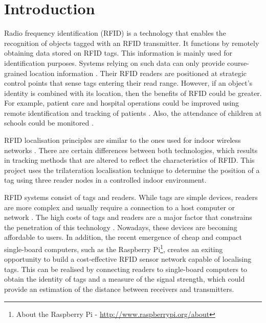 \chapter{Introduction}
\label{ch:introduction}

Radio frequency identification (RFID) is a technology that enables the recognition of objects tagged with an RFID transmitter. It functions by remotely obtaining data stored on RFID tags. This information is mainly used for identification purposes. Systems relying on such data can only provide course-grained location information \cite{Bouet2008}. Their RFID readers are positioned at strategic control points that sense tags entering their read range. However, if an object's identity is combined with its location, then the benefits of RFID could be greater. For example, patient care and hospital operations could be improved using remote identification and tracking of patients \cite{Cangialosi2007}. Also, the attendance of children at schools could be monitored \cite{Swartz2004}.

RFID localisation principles are similar to the ones used for indoor wireless networks \cite{Bouet2008}. There are certain differences between both technologies, which results in tracking methods that are altered to reflect the characteristics of RFID. This project uses the trilateration localisation technique to determine the position of a tag using three reader nodes in a controlled indoor environment.

RFID systems consist of tags and readers. While tags are simple devices, readers are more complex and usually require a connection to a host computer or network \cite{Landt2005}. The high costs of tags and readers are a major factor that constrains the penetration of this technology \cite{Want2006}. Nowadays, these devices are becoming affordable to users. In addition, the recent emergence of cheap and compact single-board computers, such as the Raspberry Pi\footnote{About the Raspberry Pi - \url{http://www.raspberrypi.org/about}}, creates an exiting opportunity to build a cost-effective RFID sensor network capable of localising tags. This can be realised by connecting readers to single-board computers to obtain the identity of tags and a measure of the signal strength, which could provide an estimation of the distance between receivers and transmitters.

